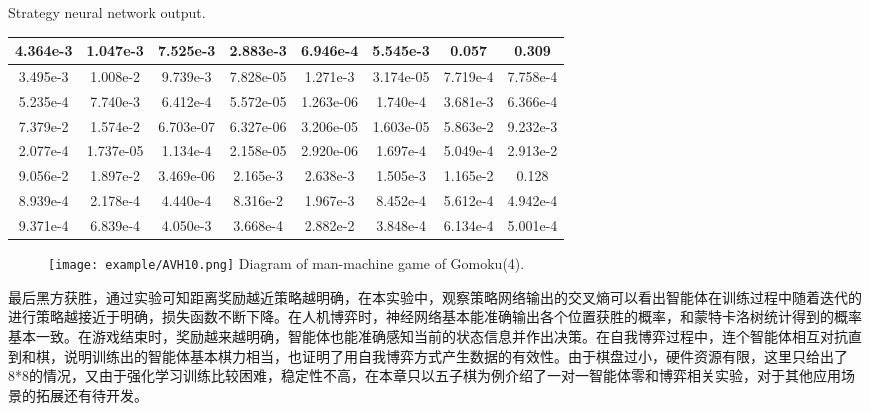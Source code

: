 \begin{table}[htbp]
	\centering
	{Strategy neural network output.}
	\label{tab:celueshenjingwangluoshuchu}
	\begin{tabular}{|c|c|c|c|c|c|c|c|}
		\hline 
		4.364e-3 & 1.047e-3 & 7.525e-3 & 2.883e-3 & 6.946e-4 & 5.545e-3 & 0.057 & 0.309 \\ 
		\hline 
		3.495e-3 & 1.008e-2 & 9.739e-3 & 7.828e-05 & 1.271e-3 & 3.174e-05 & 7.719e-4 & 7.758e-4 \\ 
		\hline 
		5.235e-4 & 7.740e-3 & 6.412e-4 & 5.572e-05 & 1.263e-06 & 1.740e-4 & 3.681e-3 & 6.366e-4 \\ 
		\hline 
		7.379e-2 & 1.574e-2 & 6.703e-07 & 6.327e-06 & 3.206e-05 & 1.603e-05 & 5.863e-2 & 9.232e-3 \\ 
		\hline 
		2.077e-4 & 1.737e-05 & 1.134e-4 & 2.158e-05 & 2.920e-06 & 1.697e-4 & 5.049e-4 & 2.913e-2 \\ 
		\hline 
		9.056e-2 & 1.897e-2 & 3.469e-06 & 2.165e-3 & 2.638e-3 & 1.505e-3 & 1.165e-2 & 0.128 \\ 
		\hline 
		8.939e-4 & 2.178e-4 & 4.440e-4 & 8.316e-2 & 1.967e-3 & 8.452e-4 & 5.612e-4 & 4.942e-4 \\ 
		\hline 
		9.371e-4 & 6.839e-4 & 4.050e-3 & 3.668e-4 & 2.882e-2 & 3.848e-4 & 6.134e-4 &5.001e-4 \\ 
		\hline 
	\end{tabular} 
\end{table}

\begin{figure}[htbp]
	\centering
	\texttt{[image: example/AVH10.png]}
	\hspace{0.5cm}
	{Diagram of man-machine game of Gomoku(4).}
	\label{fig:human6}
\end{figure}


最后黑方获胜，通过实验可知距离奖励越近策略越明确，在本实验中，观察策略网络输出的交叉熵可以看出智能体在训练过程中随着迭代的进行策略越接近于明确，损失函数不断下降。在人机博弈时，神经网络基本能准确输出各个位置获胜的概率，和蒙特卡洛树统计得到的概率基本一致。在游戏结束时，奖励越来越明确，智能体也能准确感知当前的状态信息并作出决策。在自我博弈过程中，连个智能体相互对抗直到和棋，说明训练出的智能体基本棋力相当，也证明了用自我博弈方式产生数据的有效性。由于棋盘过小，硬件资源有限，这里只给出了8*8的情况，又由于强化学习训练比较困难，稳定性不高，在本章只以五子棋为例介绍了一对一智能体零和博弈相关实验，对于其他应用场景的拓展还有待开发。

